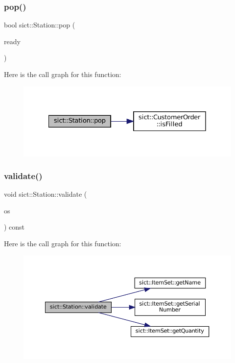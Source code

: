 \subsubsection{\texorpdfstring{pop()}{pop()}}
{\footnotesize\ttfamily bool sict\+::\+Station\+::pop (\begin{DoxyParamCaption}\item[{\mbox{\hyperlink{classsict_1_1CustomerOrder}{Customer\+Order}} \&}]{ready }\end{DoxyParamCaption})}

Here is the call graph for this function\+:
\nopagebreak
\begin{figure}[H]
\begin{center}
\leavevmode
\includegraphics[width=328pt]{classsict_1_1Station_a583745c920a8fd95aaaf84ef2d96a993_cgraph}
\end{center}
\end{figure}
\mbox{\label{classsict_1_1Station_a93da83c7e33b4b336225cc4753ee91da}} 
\subsubsection{\texorpdfstring{validate()}{validate()}}
{\footnotesize\ttfamily void sict\+::\+Station\+::validate (\begin{DoxyParamCaption}\item[{std\+::ostream \&}]{os }\end{DoxyParamCaption}) const}

Here is the call graph for this function\+:
\nopagebreak
\begin{figure}[H]
\begin{center}
\leavevmode
\includegraphics[width=350pt]{classsict_1_1Station_a93da83c7e33b4b336225cc4753ee91da_cgraph}
\end{center}
\end{figure}


